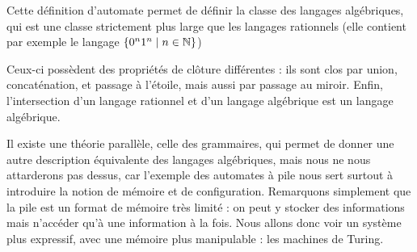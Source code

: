 Cette définition d'automate permet de définir la classe des langages algébriques, qui est une classe strictement plus large que les langages rationnels (elle contient par exemple le langage $\{0^n1^n\mid n\in\mathbb{N}\}$)

Ceux-ci possèdent des propriétés de clôture différentes : ils sont clos par union, concaténation, et passage à l'étoile, mais aussi par passage au miroir. Enfin, l'intersection d'un langage rationnel et d'un langage algébrique est un langage algébrique.

Il existe une théorie parallèle, celle des grammaires, qui permet de donner une autre description équivalente des langages algébriques, mais nous ne nous attarderons pas dessus, car l'exemple des automates à pile nous sert surtout à introduire la notion de mémoire et de configuration. Remarquons simplement que la pile est un format de mémoire très limité : on peut y stocker des informations mais n'accéder qu'à une information à la fois. Nous allons donc voir un système plus expressif, avec une mémoire plus manipulable : les machines de Turing.